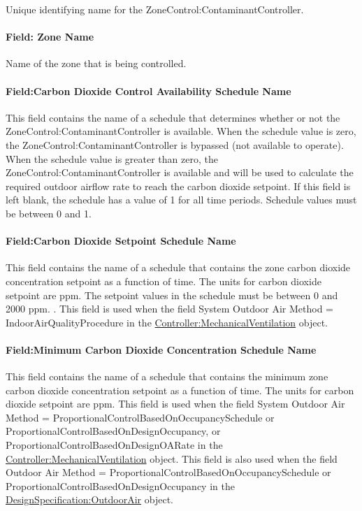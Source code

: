 Unique identifying name for the ZoneControl:ContaminantController.

\paragraph{Field: Zone Name}\label{field-controlled-zone-name-000}

Name of the zone that is being controlled.

\paragraph{Field:Carbon Dioxide Control Availability Schedule Name}\label{fieldcarbon-dioxide-control-availability-schedule-name}

This field contains the name of a schedule that determines whether or not the ZoneControl:ContaminantController is available. When the schedule value is zero, the ZoneControl:ContaminantController is bypassed (not available to operate). When the schedule value is greater than zero, the ZoneControl:ContaminantController is available and will be used to calculate the required outdoor airflow rate to reach the carbon dioxide setpoint. If this field is left blank, the schedule has a value of 1 for all time periods. Schedule values must be between 0 and 1.

\paragraph{Field:Carbon Dioxide Setpoint Schedule Name}\label{fieldcarbon-dioxide-setpoint-schedule-name}

This field contains the name of a schedule that contains the zone carbon dioxide concentration setpoint as a function of time. The units for carbon dioxide setpoint are ppm. The setpoint values in the schedule must be between 0 and 2000 ppm. . This field is used when the field System Outdoor Air Method = IndoorAirQualityProcedure in the \hyperref[controllermechanicalventilation]{Controller:MechanicalVentilation} object.

\paragraph{Field:Minimum Carbon Dioxide Concentration Schedule Name}\label{fieldminimum-carbon-dioxide-concentration-schedule-name}

This field contains the name of a schedule that contains the minimum zone carbon dioxide concentration setpoint as a function of time. The units for carbon dioxide setpoint are ppm. This field is used when the field System Outdoor Air Method = ProportionalControlBasedOnOccupancySchedule or ProportionalControlBasedOnDesignOccupancy, or ProportionalControlBasedOnDesignOARate in the \hyperref[controllermechanicalventilation]{Controller:MechanicalVentilation} object. This field is also used when the field Outdoor Air Method = ProportionalControlBasedOnOccupancySchedule or ProportionalControlBasedOnDesignOccupancy in the \hyperref[designspecificationoutdoorair]{DesignSpecification:OutdoorAir} object.

